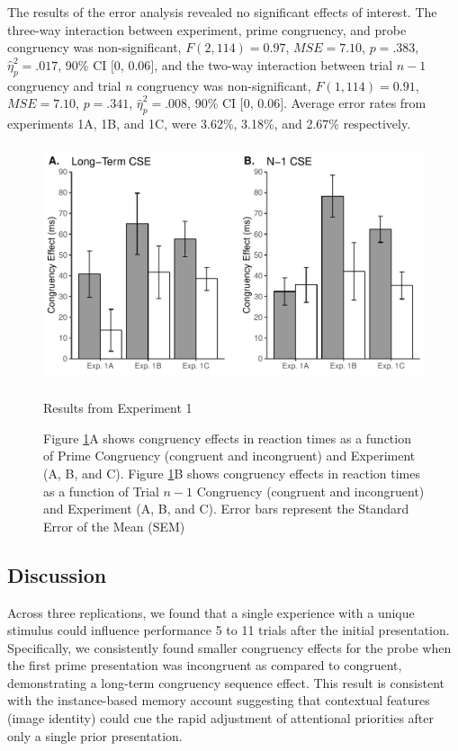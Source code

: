 \documentclass[]{DissertateCUNY}
\begin{document}
The results of the error analysis revealed no significant effects of
interest. The three-way interaction between experiment, prime
congruency, and probe congruency was non-significant,
\(F(2, 114) = 0.97\), \(\mathit{MSE} = 7.10\), \(p = .383\),
\(\hat{\eta}^2_p = .017\), 90\% CI \([0\), \(0.06]\), and the two-way
interaction between trial \(n-1\) congruency and trial \(n\) congruency
was non-significant, \(F(1, 114) = 0.91\), \(\mathit{MSE} = 7.10\),
\(p = .341\), \(\hat{\eta}^2_p = .008\), 90\% CI \([0\), \(0.06]\).
Average error rates from experiments 1A, 1B, and 1C, were 3.62\%,
3.18\%, and 2.67\% respectively.

\begin{figure}
  \centering
  \includegraphics[height=2.75in]{figures/MGfigure2.pdf}
  \caption{Results from Experiment 1}
  \caption*{Figure \ref{MG_figure2}A shows congruency effects in reaction times as a function of Prime Congruency (congruent and incongruent) and Experiment (A, B, and C). Figure \ref{MG_figure2}B shows congruency effects in reaction times as a function of Trial $n-1$ Congruency (congruent and incongruent) and Experiment (A, B, and C). Error bars represent the Standard Error of the Mean (SEM)}

  \label{MG_figure2}
\end{figure}

\hypertarget{discussion-4}{%
\subsection{Discussion}\label{discussion-4}}

Across three replications, we found that a single experience with a
unique stimulus could influence performance 5 to 11 trials after the
initial presentation. Specifically, we consistently found smaller
congruency effects for the probe when the first prime presentation was
incongruent as compared to congruent, demonstrating a long-term
congruency sequence effect. This result is consistent with the
instance-based memory account suggesting that contextual features (image
identity) could cue the rapid adjustment of attentional priorities after
only a single prior presentation.
\end{document}
